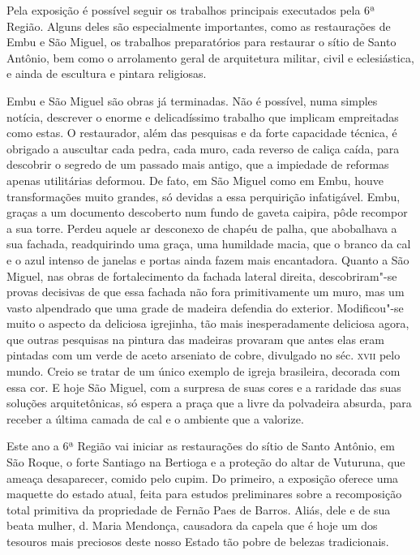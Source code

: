 Pela exposição é possível seguir os trabalhos principais executados pela
6ª Região. Alguns deles são especialmente importantes, como as
restaurações de Embu e São Miguel, os trabalhos preparatórios para
restaurar o sítio de Santo Antônio, bem como o arrolamento geral de
arquitetura militar, civil e eclesiástica, e ainda de escultura e
pintara religiosas.

Embu e São Miguel são obras já terminadas. Não é possível, numa simples
notícia, descrever o enorme e delicadíssimo trabalho que implicam
empreitadas como estas. O restaurador, além das pesquisas e da forte
capacidade técnica, é obrigado a auscultar cada pedra, cada muro, cada
reverso de caliça caída, para descobrir o segredo de um passado mais
antigo, que a impiedade de reformas apenas utilitárias deformou. De
fato, em São Miguel como em Embu, houve transformações muito grandes, só
devidas a essa perquirição infatigável. Embu, graças a um documento
descoberto num fundo de gaveta caipira, pôde recompor a sua torre.
Perdeu aquele ar desconexo de chapéu de palha, que abobalhava a sua
fachada, readquirindo uma graça, uma humildade macia, que o branco da
cal e o azul intenso de janelas e portas ainda fazem mais encantadora.
Quanto a São Miguel, nas obras de fortalecimento da fachada lateral
direita, descobriram"-se provas decisivas de que essa fachada não fora
primitivamente um muro, mas um vasto alpendrado que uma grade de madeira
defendia do exterior. Modificou"-se muito o aspecto da deliciosa
igrejinha, tão mais inesperadamente deliciosa agora, que outras
pesquisas na pintura das madeiras provaram que antes elas eram pintadas
com um verde de aceto arseniato de cobre, divulgado no séc. \textsc{xvii} pelo
mundo. Creio se tratar de um único exemplo de igreja brasileira,
decorada com essa cor. E hoje São Miguel, com a surpresa de suas cores e
a raridade das suas soluções arquitetônicas, só espera a praça que a
livre da polvadeira absurda, para receber a última camada de cal e o
ambiente que a valorize.

Este ano a 6ª Região vai iniciar as restaurações do sítio de Santo
Antônio, em São Roque, o forte Santiago na Bertioga e a proteção do
altar de Vuturuna, que ameaça desaparecer, comido pelo cupim. Do
primeiro, a exposição oferece uma maquette do estado atual, feita para
estudos preliminares sobre a recomposição total primitiva da propriedade
de Fernão Paes de Barros. Aliás, dele e de sua beata mulher, d. Maria
Mendonça, causadora da capela que é hoje um dos tesouros mais preciosos
deste nosso Estado tão pobre de belezas tradicionais.

